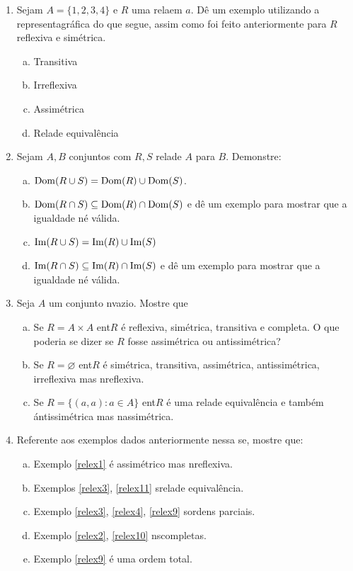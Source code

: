 \begin{enumerate}[{\bf 1.}]
\item Sejam $A=\{1,2,3,4\}$ e $R$ uma rela\cao em $a$. D\^e um exemplo utilizando a representa\cao gr\'afica do que segue, assim como foi feito anteriormente para $R$ reflexiva e sim\'etrica.
\begin{enumerate}[a)]
\item Transitiva
\item Irreflexiva
\item Assim\'etrica
\item Rela\cao de equival\^encia
\end{enumerate}

\item Sejam $A,B$ conjuntos com $R,S$ rela\coes de $A$ para $B$. Demonstre:
\begin{enumerate}[a)]
\item $\operatorname{Dom}(R\cup S)=\operatorname{Dom}(R)\cup \operatorname{Dom}(S)$.
\item $\operatorname{Dom}(R\cap S)\subseteq \operatorname{Dom}(R)\cap \operatorname{Dom}(S)$ e d\^e um exemplo para mostrar que a igualdade n\ao \'e v\'alida.
\item $\operatorname{Im}(R\cup S)=\operatorname{Im}(R)\cup \operatorname{Im}(S)$
\item $\operatorname{Im}(R\cap S)\subseteq \operatorname{Im}(R)\cap \operatorname{Im}(S)$ e d\^e um exemplo para mostrar que a igualdade n\ao \'e v\'alida.
\end{enumerate}

\item Seja $A$ um conjunto n\ao vazio. Mostre que
\begin{enumerate}[a)]
\item Se $R=A\times A$ ent\ao $R$ \'e reflexiva, sim\'etrica, transitiva e completa. O que poderia se dizer se $R$ fosse assim\'etrica ou antissim\'etrica? 
\item Se $R=\varnothing$ ent\ao $R$ \'e sim\'etrica, transitiva, assim\'etrica, antissim\'etrica, irreflexiva mas n\ao reflexiva.
\item Se $R=\{(a,a):a\in A\}$ ent\ao $R$ \'e uma rela\cao de equival\^encia e tamb\'em \' antissim\'etrica mas n\ao assim\'etrica.
\end{enumerate}

\item Referente aos exemplos dados anteriormente nessa se\caoi, mostre que:
\begin{enumerate}[a)]
\item Exemplo \ref{relex1} \'e assim\'etrico mas n\ao reflexiva. 
\item Exemplos \ref{relex3}, \ref{relex11} s\ao rela\coes de equival\^encia.
\item Exemplo \ref{relex3}, \ref{relex4}, \ref{relex9} s\ao ordens parciais.
\item Exemplo \ref{relex2}, \ref{relex10} n\ao s\ao completas.
\item Exemplo \ref{relex9} \'e uma ordem total.
\end{enumerate}


\end{enumerate}
